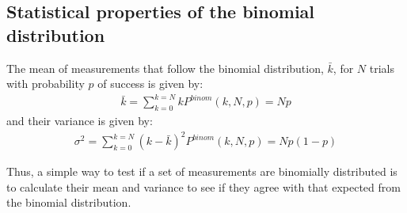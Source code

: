 \subsection{Statistical properties of the binomial distribution}
The mean of measurements that follow the binomial distribution, $\bar k$, for $N$ trials with probability $p$ of success is given by:
\begin{align}
\bar k = \sum_{k=0}^{k=N}kP^{binom}(k,N,p)=Np
\end{align}
and their variance is given by:
\begin{align}
\sigma^2 = \sum_{k=0}^{k=N}(k-\bar k)^2P^{binom}(k,N,p)=Np(1-p)
\end{align}

Thus, a simple way to test if a set of measurements are binomially distributed is to calculate their mean and variance to see if they agree with that expected from the binomial distribution.

